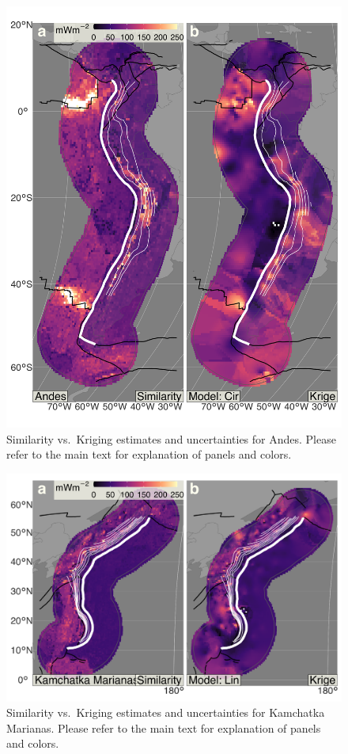 \begin{figure}
\centering
\includegraphics{assets/figs/chpt3/AndesDiffComp.png}
\caption[Similarity vs.~Kriging estimates and uncertainties for Andes]{Similarity vs.~Kriging estimates and uncertainties for Andes. Please refer to the main text for explanation of panels and colors.}
\end{figure}

\begin{figure}
\centering
\includegraphics{assets/figs/chpt3/KamchatkaMarianasDiffComp.png}
\caption[Similarity vs.~Kriging estimates and uncertainties for Kamchatka Marianas]{Similarity vs.~Kriging estimates and uncertainties for Kamchatka Marianas. Please refer to the main text for explanation of panels and colors.}
\end{figure}

